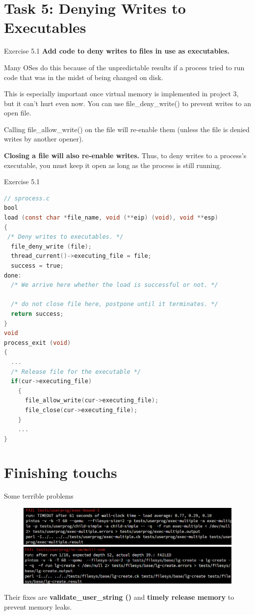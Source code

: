 \documentclass[10pt]{beamer}
\begin{document}
\section{Task 5: Denying Writes to Executables}
\begin{frame}[fragile]{Exercise 5.1}
\textbf{Add code to deny writes to files in use as executables.}

Many OSes do this because of the unpredictable results if a process tried to run code that was in the midst of being changed on disk.

This is especially important once virtual memory is implemented in project 3, but it can't hurt even now.
You can use file\_deny\_write() to prevent writes to an open file.

Calling file\_allow\_write() on the file will re-enable them (unless the file is denied writes by another opener).

\textbf{Closing a file will also re-enable writes.} Thus, to deny writes to a process's executable, you must keep it open as long as the process is still running.
\end{frame}
\begin{frame}[fragile]{Exercise 5.1}
    \begin{lstlisting}[language=C]
// sprocess.c
bool
load (const char *file_name, void (**eip) (void), void **esp) 
{
 /* Deny writes to executables. */
  file_deny_write (file);
  thread_current()->executing_file = file;
  success = true;
done:
  /* We arrive here whether the load is successful or not. */

  /* do not close file here, postpone until it terminates. */
  return success;
}
void
process_exit (void)
{
  ...
  /* Release file for the executable */
  if(cur->executing_file) 
    {
      file_allow_write(cur->executing_file);
      file_close(cur->executing_file);
    }
    ...
}
    \end{lstlisting}
\end{frame}
\section{Finishing touchs}
\begin{frame}[fragile]{Some terrible problems}
\begin{figure}
    \centering
    \includegraphics[width=\linewidth]{figures/exbound3.png}
    \includegraphics[width=\linewidth]{figures/muti.png}
\end{figure}
Their fixes are \textbf{validate\_user\_string ()} and \textbf{timely release memory} to prevent memory leaks.
\end{frame}
\end{document}
